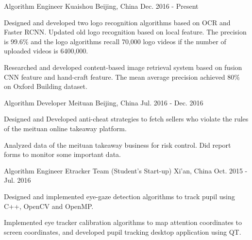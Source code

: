 

\begin{cventries}

  \cventry
    {Algorithm Engineer} %
    {Kuaishou} %
    {Beijing, China} %
    {Dec. 2016 - Present} %
    {
      \begin{cvitems} %
        \item {Designed and developed two logo recognition algorithms based on OCR and Faster RCNN. Updated old logo recognition based on local feature. The precision is 99.6\% and the logo algorithms recall 70,000 logo videos if the number of uploaded videos is 6400,000.}
        \item {Researched and developed content-based image retrieval system based on fusion CNN feature and hand-craft feature. The mean average precision achieved 80\% on Oxford Building dataset.}
      \end{cvitems}
    }

  \cventry
    {Algorithm Developer} %
    {Meituan} %
    {Beijing, China} %
    {Jul. 2016 - Dec. 2016} %
    {
      \begin{cvitems} %
        \item {Designed and Developed anti-cheat strategies to fetch sellers who violate the rules of the meituan online takeaway platform.}
        \item {Analyzed data of the meituan takeaway business for risk control. Did report forms to monitor some important data.}
      \end{cvitems}
    }

  \cventry
    {Algorithm Engineer} %
    {Etracker Team (Student's Start-up)} %
    {Xi'an, China} %
    {Oct. 2015 - Jul. 2016} %
    {
      \begin{cvitems} %
        \item {Designed and implemented eye-gaze detection algorithms to track pupil using C++, OpenCV and OpenMP.}
        \item {Implemented eye tracker calibration algorithms to map attention coordinates to screen coordinates, and developed pupil tracking desktop application using QT.}
      \end{cvitems}
    }


\end{cventries}
